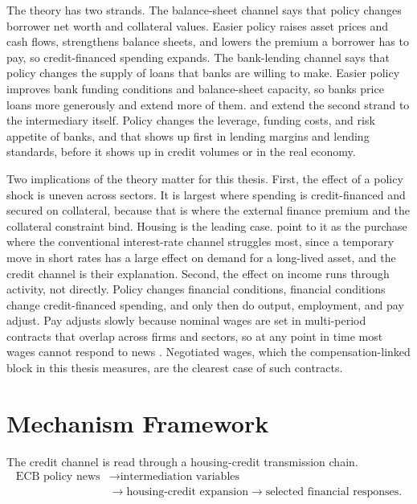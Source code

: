The theory has two strands. The balance-sheet channel says that policy changes borrower net worth and collateral values. Easier policy raises asset prices and cash flows, strengthens balance sheets, and lowers the premium a borrower has to pay, so credit-financed spending expands. The bank-lending channel says that policy changes the supply of loans that banks are willing to make. Easier policy improves bank funding conditions and balance-sheet capacity, so banks price loans more generously and extend more of them. \textcite{AdrianShin2010} and \textcite{BorioZhu2012} extend the second strand to the intermediary itself. Policy changes the leverage, funding costs, and risk appetite of banks, and that shows up first in lending margins and lending standards, before it shows up in credit volumes or in the real economy.

Two implications of the theory matter for this thesis. First, the effect of a policy shock is uneven across sectors. It is largest where spending is credit-financed and secured on collateral, because that is where the external finance premium and the collateral constraint bind. Housing is the leading case. \textcite{BernankeGertler1995} point to it as the purchase where the conventional interest-rate channel struggles most, since a temporary move in short rates has a large effect on demand for a long-lived asset, and the credit channel is their explanation. Second, the effect on income runs through activity, not directly. Policy changes financial conditions, financial conditions change credit-financed spending, and only then do output, employment, and pay adjust. Pay adjusts slowly because nominal wages are set in multi-period contracts that overlap across firms and sectors, so at any point in time most wages cannot respond to news \parencite{Taylor1980}. Negotiated wages, which the compensation-linked block in this thesis measures, are the clearest case of such contracts.

\section{Mechanism Framework}

The credit channel is read through a housing-credit transmission chain.
\begin{equation}
\begin{aligned}
  \text{ECB policy news}
  &\rightarrow
  \text{intermediation variables} \\
  &\rightarrow
  \text{housing-credit expansion}
  \rightarrow
  \text{selected financial responses}.
\end{aligned}
\label{eq:mechanism-chain}
\end{equation}

